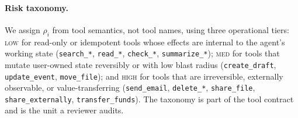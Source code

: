 \documentclass[conference,onecolumn]{IEEEtran}
\begin{document}
\paragraph{Risk taxonomy.} We assign $\rho_i$ from tool semantics, not tool names, using three operational tiers: \textsc{low} for read-only or idempotent tools whose effects are internal to the agent's working state (\texttt{search\_*}, \texttt{read\_*}, \texttt{check\_*}, \texttt{summarize\_*}); \textsc{med} for tools that mutate user-owned state reversibly or with low blast radius (\texttt{create\_draft}, \texttt{update\_event}, \texttt{move\_file}); and \textsc{high} for tools that are irreversible, externally observable, or value-transferring (\texttt{send\_email}, \texttt{delete\_*}, \texttt{share\_file}, \texttt{share\_externally}, \texttt{transfer\_funds}). The taxonomy is part of the tool contract and is the unit a reviewer audits.
\end{document}

